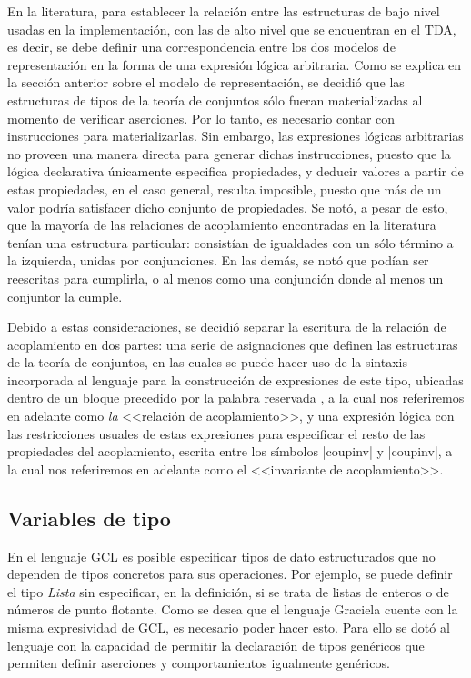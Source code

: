 {{En la literatura, para establecer la relación entre las estructuras de bajo
nivel usadas en la implementación, con las de alto nivel que se encuentran en el
TDA, es decir, se debe definir una correspondencia entre los dos modelos de
representación en la forma de una expresión lógica arbitraria. Como se explica
en la sección anterior sobre el modelo de representación, se decidió que las
estructuras de tipos de la teoría de conjuntos sólo fueran materializadas al
momento de verificar aserciones. Por lo tanto, es necesario contar con
instrucciones para materializarlas. Sin embargo, las expresiones lógicas
arbitrarias no proveen una manera directa para generar dichas instrucciones,
puesto que la lógica declarativa únicamente especifica propiedades, y deducir
valores a partir de estas propiedades, en el caso general, resulta imposible,
puesto que más de un valor podría satisfacer dicho conjunto de propiedades. Se
notó, a pesar de esto, que la mayoría de las relaciones de acoplamiento
encontradas en la literatura tenían una estructura particular: consistían de
igualdades con un sólo término a la izquierda, unidas por conjunciones. En las
demás,  se notó que podían ser reescritas para cumplirla, o al menos como una
conjunción donde al menos un conjuntor la cumple.

Debido a estas consideraciones, se decidió separar la escritura de la relación
de acoplamiento en dos partes: una serie de asignaciones que definen las
estructuras de la teoría de conjuntos, en las cuales se puede hacer uso de la
sintaxis incorporada al lenguaje para la construcción de expresiones de este
tipo, ubicadas dentro de un bloque  precedido por la palabra reservada
, a la cual nos referiremos en adelante como \textit{la}
<<relación de acoplamiento>>, y una expresión lógica con las restricciones
usuales de estas expresiones para especificar el resto de las propiedades del
acoplamiento, escrita entre los símbolos \ingra|{coupinv| y
\ingra|coupinv}|, a la cual nos referiremos en adelante como el <<invariante
de acoplamiento>>.

\subsection{Variables de tipo}

En el lenguaje GCL es posible especificar tipos de dato estructurados que no
dependen de tipos concretos para sus operaciones. Por ejemplo, se puede definir
el tipo \textit{Lista} sin  especificar, en la definición, si se trata de listas
de enteros o de números de punto flotante. Como se desea que el lenguaje
Graciela cuente con la misma expresividad de GCL, es necesario poder hacer esto.
Para ello se dotó al lenguaje con la capacidad de permitir la declaración de
tipos genéricos que permiten definir aserciones y comportamientos igualmente
genéricos.

}}
